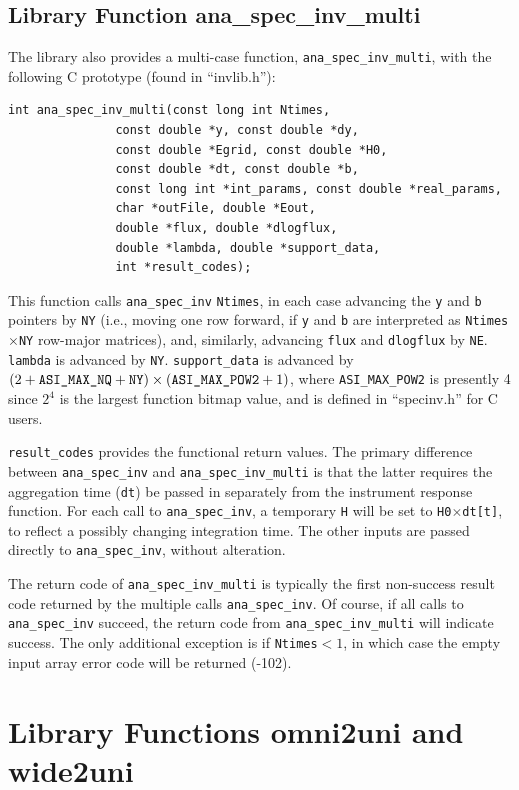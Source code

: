 \documentclass{article}    %
\begin{document}
\subsection{Library Function ana\_spec\_inv\_multi}
The library also provides a multi-case function,
\verb|ana_spec_inv_multi|, with the following C prototype (found in
``invlib.h''):
\begin{verbatim}
int ana_spec_inv_multi(const long int Ntimes,
		       const double *y, const double *dy, 
		       const double *Egrid, const double *H0, 
		       const double *dt, const double *b,
		       const long int *int_params, const double *real_params,
		       char *outFile, double *Eout, 
		       double *flux, double *dlogflux, 
		       double *lambda, double *support_data, 
		       int *result_codes);
\end{verbatim}
This function calls \verb|ana_spec_inv| \verb|Ntimes|, in each case
advancing the \verb|y| and \verb|b| pointers by \verb|NY| (i.e.,
moving one row forward, if \verb|y| and \verb|b| are interpreted as
\verb|Ntimes|$\times$\verb|NY| row-major matrices), and, similarly,
advancing \verb|flux| and \verb|dlogflux| by
\verb|NE|. \verb|lambda| is advanced by \verb|NY|.
\verb|support_data| is advanced by $(2+\verb|ASI_MAX_NQ|+\verb|NY|)\times(\verb|ASI_MAX_POW2|+1)$,
where \verb|ASI_MAX_POW2| is presently 4 since $2^4$ is the largest
function bitmap value, and is defined in ``specinv.h'' for C users.

\verb|result_codes| provides the functional return values.
The primary difference between \verb|ana_spec_inv| and
\verb|ana_spec_inv_multi| is that the latter requires
the aggregation time (\verb|dt|) be passed in separately from the
instrument response function. For each call to \verb|ana_spec_inv|, a
temporary \verb|H| will be set to \verb|H0|$\times$\verb|dt[t]|, to
reflect a possibly changing integration time. The other inputs
are passed directly to \verb|ana_spec_inv|, without alteration.

The return code of \verb|ana_spec_inv_multi| is typically the first
non-success result code returned by the multiple calls
\verb|ana_spec_inv|. Of course, if all calls to \verb|ana_spec_inv| succeed,
the return code from \verb|ana_spec_inv_multi| will indicate
success. The only additional exception is if \verb|Ntimes|$<1$, in
which case the empty input array error code will be returned (-102).


\section{Library Functions omni2uni and wide2uni}
\end{document}
